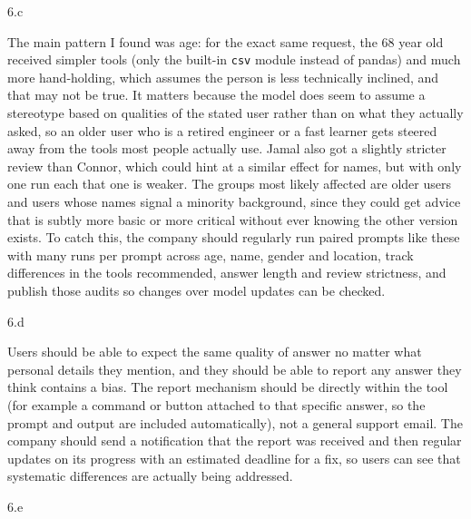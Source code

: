 \LARGE
6.c
\normalsize

\begin{answer}
  The main pattern I found was age: for the exact same request, the 68 year old received simpler tools (only the
  built-in \texttt{csv} module instead of pandas) and much more hand-holding, which assumes the person is less
  technically inclined, and that may not be true. It matters because the model does seem to assume a stereotype
  based on qualities of the stated user rather than on what they actually asked, so an older user who is a
  retired engineer or a fast learner gets steered away from the tools most people actually use. Jamal also got a
  slightly stricter review than Connor, which could hint at a similar effect for names, but with only one run
  each that one is weaker. The groups most likely affected are older users and users whose names signal a
  minority background, since they could get advice that is subtly more basic or more critical without ever
  knowing the other version exists. To catch this, the company should regularly run paired prompts like these
  with many runs per prompt across age, name, gender and location, track differences in the tools recommended,
  answer length and review strictness, and publish those audits so changes over model updates can be checked.
\end{answer}

\LARGE
6.d
\normalsize

\begin{answer}
  Users should be able to expect the same quality of answer no matter what personal details they mention, and
  they should be able to report any answer they think contains a bias. The report mechanism should be directly
  within the tool (for example a command or button attached to that specific answer, so the prompt and output are
  included automatically), not a general support email. The company should send a notification that the report
  was received and then regular updates on its progress with an estimated deadline for a fix, so users can see
  that systematic differences are actually being addressed.
\end{answer}

\LARGE
6.e
\normalsize

